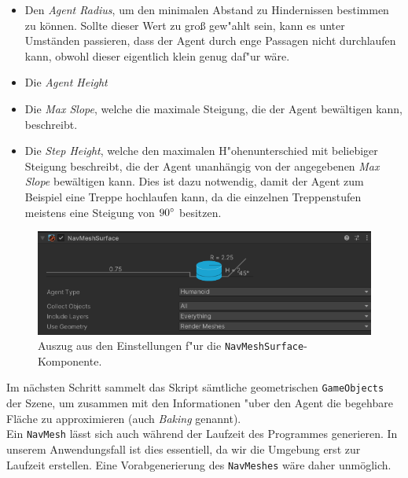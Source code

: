 \begin{itemize}
	\item Den \textit{Agent Radius}, um den minimalen Abstand zu Hindernissen bestimmen zu können. Sollte dieser Wert zu groß gew"ahlt sein, kann es unter Umständen passieren, dass der Agent durch enge Passagen nicht durchlaufen kann, obwohl dieser eigentlich klein genug daf"ur wäre.
	\item Die \textit{Agent Height}
	\item Die \textit{Max Slope}, welche die maximale Steigung, die der Agent bewältigen kann, beschreibt.
	\item Die \textit{Step Height}, welche den maximalen H"ohenunterschied mit beliebiger Steigung beschreibt, die der Agent unanhängig von der angegebenen \textit{Max Slope} bewältigen kann. Dies ist dazu notwendig, damit der Agent zum Beispiel eine Treppe hochlaufen kann, da die einzelnen Treppenstufen meistens eine Steigung von $90 \degree$ besitzen.
\end{itemize}

\begin{figure}
	\centering
	\includegraphics[width=0.8\linewidth]{resources/img/navMesh02.png}
	\caption{Auszug aus den Einstellungen f"ur die \texttt{NavMeshSurface}-Komponente.}
	\label{fig:navMesh02}
\end{figure}

Im nächsten Schritt sammelt das Skript sämtliche geometrischen \texttt{GameObjects} der Szene, um zusammen mit den Informationen "uber den Agent die begehbare Fläche zu approximieren (auch \textit{Baking} genannt).
\\
Ein \texttt{NavMesh} lässt sich auch während der Laufzeit des Programmes generieren. In unserem Anwendungsfall ist dies essentiell, da wir die Umgebung erst zur Laufzeit erstellen. Eine Vorabgenerierung des \texttt{NavMeshes} wäre daher unmöglich.
